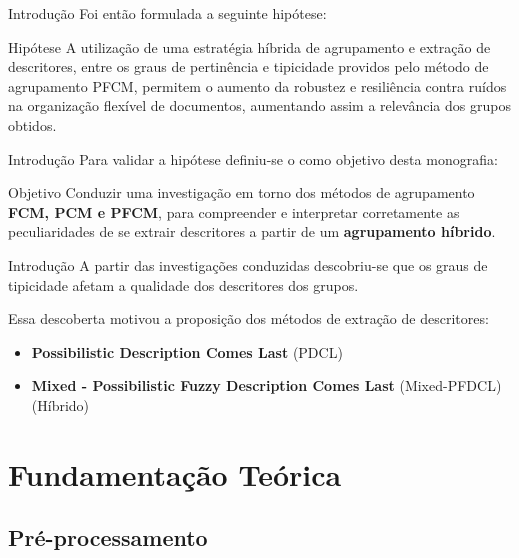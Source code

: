 \documentclass[brazil]{beamer}
\begin{document}
\begin{frame}{Introdução}
  Foi então formulada a seguinte hipótese: 
  \begin{block}{Hipótese}
    A utilização de uma estratégia \alert{híbrida} de agrupamento e extração de descritores, entre
    os graus de pertinência e tipicidade providos pelo método de agrupamento PFCM, permitem o
    aumento da robustez e resiliência contra \alert{ruídos} na \alert{organização flexível de
    documentos}, aumentando assim a relevância dos grupos obtidos.
  \end{block}

\end{frame}

\begin{frame}{Introdução}
  Para validar a hipótese definiu-se o como objetivo desta monografia:

  \begin{block}{Objetivo}
    Conduzir uma investigação em torno dos métodos de agrupamento \textbf{FCM, PCM e PFCM}, para
    compreender e interpretar corretamente as peculiaridades de se extrair descritores a partir de um
    \textbf{agrupamento híbrido}.
  \end{block}
\end{frame}

\begin{frame}{Introdução}
  A partir das investigações conduzidas descobriu-se que os \alert{graus de tipicidade}
  \alert{afetam} a qualidade dos descritores dos grupos. 

  Essa descoberta motivou a proposição dos métodos de extração de descritores:

  \begin{itemize}
    \item \textbf{Possibilistic Description Comes Last} (PDCL)
    \item \textbf{Mixed - Possibilistic Fuzzy Description Comes Last} (Mixed-PFDCL) (Híbrido)
  \end{itemize} 
\end{frame}

\section{Fundamentação Teórica}

\subsection{Pré-processamento}
\end{document}
